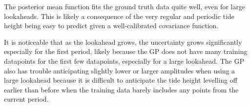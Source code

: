 \documentclass{article}
\begin{document}
                The posterior mean function fits the ground truth data quite well, even for large lookaheads. This is likely a consequence of the very regular and periodic tide height being easy to predict given a well-calibrated covariance function.

                It is noticeable that as the lookahead grows, the uncertainty grows significantly especially for the first period, likely because the GP does not have many training datapoints for the first few datapoints, especially for a large lookahead.
                The GP also has trouble anticipating slightly lower or larger amplitudes when using a large lookahead because it is difficult to anticipate the tide height levelling off earlier than before when the training data barely includes any points from the current period.
\end{document}
